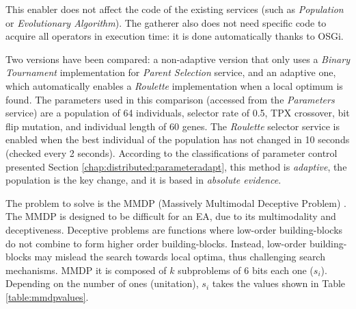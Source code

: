 This enabler does not affect the code of the existing services (such as {\em Population} or {\em Evolutionary Algorithm}). The gatherer also does not need specific code to acquire all operators in execution time: it is done automatically thanks to
OSGi. %

Two versions have been compared: a non-adaptive version that only uses a {\em Binary Tournament} implementation for {\em Parent Selection} service, and an adaptive one, which automatically enables a {\em Roulette} implementation when a local optimum is found. The parameters used in this comparison (accessed from the {\em Parameters} service) are a population of 64 individuals, selector rate of 0.5, TPX crossover, bit flip mutation, and individual length of 60 genes. The {\em Roulette} selector service is enabled when the best individual of the population has not changed in 10 seconds (checked every 2 seconds). According to the classifications of parameter control presented Section \ref{chap:distributed:parameteradapt}, this method is {\em adaptive}, the population is the key change, and it is based in {\em absolute evidence}. 

The problem to solve is the MMDP (Massively Multimodal Deceptive Problem) \cite{goldberg92massive}. The MMDP is designed to be difficult for an EA, due to
its multimodality and deceptiveness. Deceptive problems are functions where low-order building-blocks do not combine to form higher order building-blocks. Instead, low-order building-blocks may mislead the search towards local optima, thus challenging search mechanisms. MMDP it is composed of $k$ subproblems of 6 bits each one ($s_i$). Depending on
the number of ones (unitation), $s_i$ takes the values shown in Table \ref{table:mmdpvalues}.  

\begin{table}
\caption{ Basic deceptive bipolar function ($s_i$) for MMDP.}
\label{table:mmdpvalues} %

\end{table}




